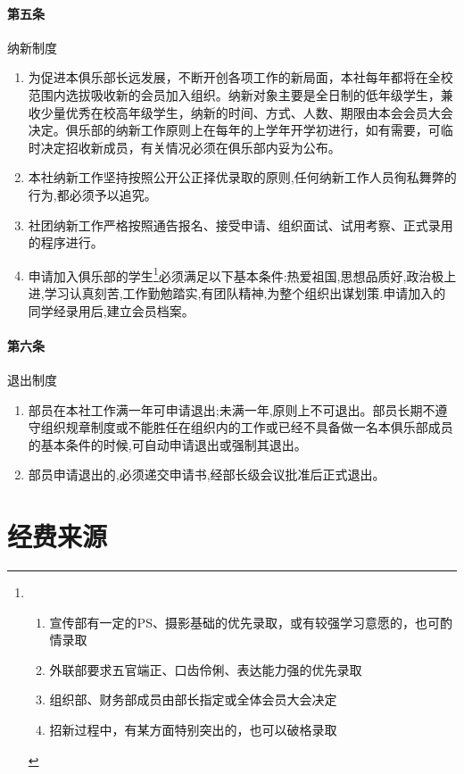 \documentclass{club}
\begin{document}
\paragraph{第五条} 纳新制度
\begin{enumerate}
    \item 为促进本俱乐部长远发展，不断开创各项工作的新局面，本社每年都将在全校范围内选拔吸收新的会员加入组织。纳新对象主要是全日制的低年级学生，兼收少量优秀在校高年级学生，纳新的时间、方式、人数、期限由本会会员大会决定。俱乐部的纳新工作原则上在每年的上学年开学初进行，如有需要，可临时决定招收新成员，有关情况必须在俱乐部内妥为公布。
    \item 本社纳新工作坚持按照公开公正择优录取的原则,任何纳新工作人员徇私舞弊的行为,都必须予以追究。
    \item 社团纳新工作严格按照通告报名、接受申请、组织面试、试用考察、正式录用的程序进行。
    \item 申请加入俱乐部的学生\footnote{
        \begin{enumerate}
            \item 宣传部有一定的PS、摄影基础的优先录取，或有较强学习意愿的，也可酌情录取
            \item 外联部要求五官端正、口齿伶俐、表达能力强的优先录取
            \item 组织部、财务部成员由部长指定或全体会员大会决定
            \item 招新过程中，有某方面特别突出的，也可以破格录取
        \end{enumerate}}必须满足以下基本条件:热爱祖国,思想品质好,政治极上进,学习认真刻苦,工作勤勉踏实,有团队精神,为整个组织出谋划策.申请加入的同学经录用后,建立会员档案。
\end{enumerate}

\paragraph{第六条} 退出制度                                      
\begin{enumerate}
    \item 部员在本社工作满一年可申请退出;未满一年,原则上不可退出。部员长期不遵守组织规章制度或不能胜任在组织内的工作或已经不具备做一名本俱乐部成员的基本条件的时候,可自动申请退出或强制其退出。
    \item 部员申请退出的,必须递交申请书,经部长级会议批准后正式退出。
\end{enumerate}



\section{经费来源}
\end{document}
